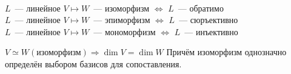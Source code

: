 \begin{definition}\leavevmode\\
    $L$~--- линейное $V\mapsto W$~--- изоморфизм $\Leftrightarrow$ $L$~--- обратимо\\
    $L$~--- линейное $V\mapsto W$~--- эпиморфизм $\Leftrightarrow$ $L$~--- сюръективно\\
    $L$~--- линейное $V\mapsto W$~--- мономорфизм $\Leftrightarrow$ $L$~--- инъективно
\end{definition}
\begin{remark}
    $V\simeq W(\text{изоморфизм})\Rightarrow  \dim V = \dim W$
    Причём изоморфизм однозначно определён выбором базисов для сопоставления.
\end{remark}

